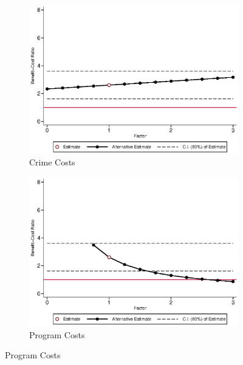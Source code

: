 \begin{figure}[H]
\ContinuedFloat			
	\begin{subfigure}[h]{0.8\textwidth}
	\centering
	\caption{Crime Costs} \label{fig:bcrf_crime_f1}
	\includegraphics[width=\textwidth]{AppOutput/Sensitivity/bcrf_crime_f1.eps}
	\end{subfigure}
	
	\begin{subfigure}[h]{0.8\textwidth}
	\centering
	\caption{Program Costs} \label{fig:bcrf_costs_f1}
	\includegraphics[width=\textwidth]{AppOutput/Sensitivity/bcrf_costs_f1.eps}
	\end{subfigure}
\end{figure}
	
